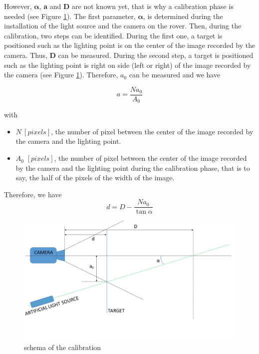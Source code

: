 However, $\bm{\alpha}$, \textbf{a} and \textbf{D} are not known yet, that is why a calibration phase is needed (see Figure \ref{fig:calibration}). The first parameter, $\bm{\alpha}$, is determined during the installation of the light source and the camera on the rover. Then, during the calibration, two steps can be identified. During the first one, a target is positioned such as the lighting point is on the center of the image recorded by the camera. Thus, \textbf{D} can be measured. During the second step, a target is positioned such as the lighting point is right on side (left or right) of the image recorded by the camera (see Figure \ref{fig:calibration}). Therefore, $a_0$ can be measured and we have

\begin{equation*}
	a = \frac{Na_0}{A_0}
\end{equation*}


with \begin{itemize} \item $N\ [pixels]$, the number of pixel between the center of the image recorded by the camera and the lighting point.
\item $A_0$ $[pixels]$, the number of pixel between the center of the image recorded by the camera and the lighting point during the calibration phase, that is to say, the half of the pixels of the width of the image.
\end{itemize}

Therefore, we have
\begin{equation}
	d=D-\frac{Na_0}{\tan \alpha}
\label{eq:formule1D}
\end{equation}

\begin{figure}[H]
  \centerline{\includegraphics[scale=0.5]{fig/calibration.jpg}}
  \caption{schema of the calibration}
  \label{fig:calibration}
\end{figure}
